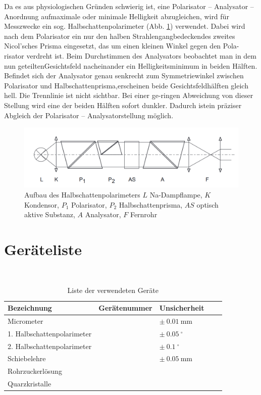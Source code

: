 \documentclass{article}
\begin{document}
Da es aus physiologischen Gründen schwierig ist, eine Polarisator – Analysator – Anordnung aufmaximale oder minimale Helligkeit abzugleichen, wird für Messzwecke ein sog. Halbschattenpolarimeter (Abb. \ref{fig:halbschattenpolarimeter}) verwendet. Dabei wird nach dem Polarisator ein nur den halben Strahlengangbedeckendes zweites Nicol'sches Prisma eingesetzt, das um einen kleinen Winkel gegen den Pola-risator verdreht ist. Beim Durchstimmen des Analysators beobachtet man in dem nun geteiltenGesichtsfeld nacheinander ein Helligkeitsminimum in beiden Hälften. Befindet sich der Analysator genau senkrecht zum Symmetriewinkel zwischen Polarisator und Halbschattenprisma,erscheinen beide Gesichtsfeldhälften gleich hell. Die Trennlinie ist nicht sichtbar. Bei einer ge-ringen Abweichung von dieser Stellung wird eine der beiden Hälften sofort dunkler. Dadurch istein präziser Abgleich der Polarisator – Analysatorstellung möglich.


\begin{figure}[H]
\centering
\includegraphics[scale=0.4]{halbschattenpolarimeter.png}
\caption{Aufbau des Halbschattenpolarimeters $L$ Na-Dampflampe, $K$ Kondensor, $P_1$ Polarisator, $P_2$ Halbschattenprisma, $AS$ optisch aktive Substanz, $A$ Analysator, $F$ Fernrohr}
\label{fig:halbschattenpolarimeter}
\end{figure}

\newpage

\section{Geräteliste}

\begin{table}[H]
\caption{Liste der verwendeten Geräte}

~

\begin{tabular}{l|llll}
Bezeichnung & Gerätenummer & Unsicherheit \\
\hline
Micrometer & & $\pm~0.01~$mm \\
1. Halbschattenpolarimeter & & $\pm~0.05~^\circ$ \\
2. Halbschattenpolarimeter & & $\pm~0.1~^\circ$ \\
Schiebelehre & & $\pm~0.05~$mm \\
Rohrzuckerlösung & & \\
Quarzkristalle & & 
\end{tabular}

\end{table}
\end{document}
